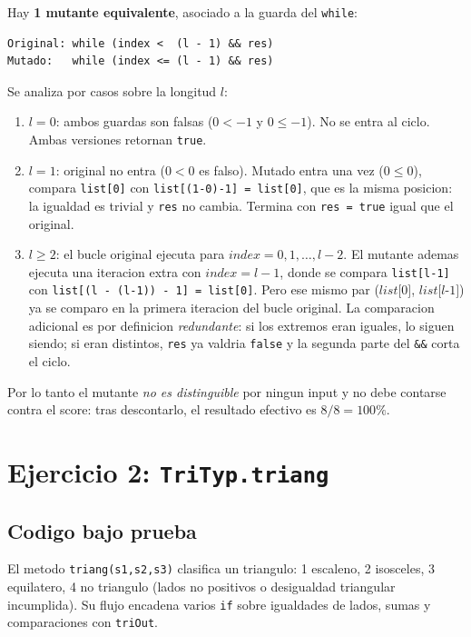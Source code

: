 \documentclass[12pt,a4paper]{article}
\begin{document}
Hay \textbf{1 mutante equivalente}, asociado a la guarda del \texttt{while}:

\begin{lstlisting}[style=codestyle]
Original: while (index <  (l - 1) && res)
Mutado:   while (index <= (l - 1) && res)
\end{lstlisting}

Se analiza por casos sobre la longitud $l$:

\begin{enumerate}
  \item $l = 0$: ambos guardas son falsas ($0 < -1$ y $0 \le -1$). No se entra al ciclo. Ambas
  versiones retornan \texttt{true}.
  \item $l = 1$: original no entra ($0 < 0$ es falso). Mutado entra una vez ($0 \le 0$), compara
  \texttt{list[0]} con \texttt{list[(1-0)-1] = list[0]}, que es la misma posicion: la igualdad
  es trivial y \texttt{res} no cambia. Termina con \texttt{res = true} igual que el original.
  \item $l \ge 2$: el bucle original ejecuta para $\textit{index} = 0, 1, \dots, l-2$. El mutante
  ademas ejecuta una iteracion extra con $\textit{index} = l - 1$, donde se compara
  \texttt{list[l-1]} con \texttt{list[(l - (l-1)) - 1] = list[0]}. Pero ese mismo par
  ($\textit{list[0]}$, $\textit{list[l-1]}$) ya se comparo en la primera iteracion del bucle
  original. La comparacion adicional es por definicion \emph{redundante}: si los extremos eran
  iguales, lo siguen siendo; si eran distintos, \texttt{res} ya valdria \texttt{false} y la
  segunda parte del \texttt{\&\&} corta el ciclo.
\end{enumerate}

Por lo tanto el mutante \emph{no es distinguible} por ningun input y no debe contarse contra el
score: tras descontarlo, el resultado efectivo es $8/8 = 100\%$.

\section{Ejercicio 2: \texttt{TriTyp.triang}}

\subsection{Codigo bajo prueba}

El metodo \texttt{triang(s1,s2,s3)} clasifica un triangulo: 1 escaleno, 2 isosceles, 3
equilatero, 4 no triangulo (lados no positivos o desigualdad triangular incumplida). Su flujo
encadena varios \texttt{if} sobre igualdades de lados, sumas y comparaciones con \texttt{triOut}.
\end{document}
